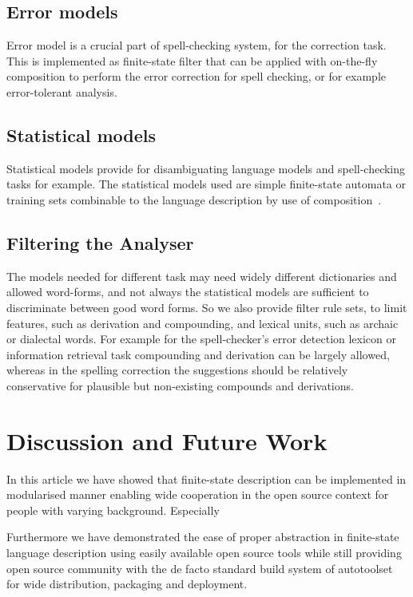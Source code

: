 \documentclass[postprint]{flammie}
\begin{document}
\subsection{Error models}

Error model is a crucial part of spell-checking system, for the correction
task. This is implemented as finite-state filter that can be 
applied with on-the-fly composition \cite{pirinen/2010/cla} to perform the
error correction for spell checking, or for example error-tolerant analysis.

\subsection{Statistical models}

Statistical models provide for disambiguating language models and spell-checking
tasks for example. The statistical models used are simple finite-state automata
or training sets combinable to the language description by use of 
composition~\cite{linden/2009/nodalida,linden/2009/fsmnlp}. 

\subsection{Filtering the Analyser}

The models needed for different task may need widely different dictionaries and
allowed word-forms, and not always the statistical models are sufficient to
discriminate between good word forms. So we also provide filter rule sets, to
limit features, such as derivation and compounding, and lexical units, such as
archaic or dialectal words. For example for the spell-checker's error detection
lexicon or information retrieval task compounding and derivation can be largely
allowed, whereas in the spelling correction the suggestions should be relatively
conservative for plausible but non-existing compounds and derivations.

\section{Discussion and Future Work}

In this article we have showed that finite-state description can be implemented
in modularised manner enabling wide cooperation in the open source context for
people with varying background. Especially

Furthermore we have demonstrated the ease of
proper abstraction in finite-state language description using easily available
open source tools while still providing open source community with the de facto
standard build system of autotoolset for wide distribution, packaging and
deployment.
\end{document}
